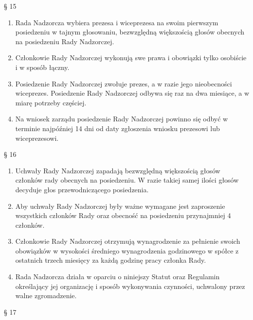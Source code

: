 \documentclass[a4paper, 11pt]{article}
\begin{document}
§ 15\\
\begin{enumerate}
\item	Rada Nadzorcza wybiera prezesa i wiceprezesa na swoim pierwszym posiedzeniu w tajnym głosowaniu, bezwzględną większością głosów obecnych na posiedzeniu Rady Nadzorczej.
\item	Członkowie Rady Nadzorczej wykonują swe prawa i obowiązki tylko osobiście i w sposób łączny.
\item	Posiedzenie Rady Nadzorczej zwołuje prezes, a w razie jego nieobecności wiceprezes. Posiedzenie Rady Nadzorczej odbywa się raz na dwa miesiące, a w miarę potrzeby częściej.
\item	Na wniosek zarządu posiedzenie Rady Nadzorczej powinno się odbyć w terminie najpóźniej 14 dni od daty zgłoszenia wniosku prezesowi lub wiceprezesowi.

\end{enumerate}

§ 16\\
\begin{enumerate}
\item	Uchwały Rady Nadzorczej zapadają bezwzględną większością głosów członków rady obecnych na posiedzeniu. W razie takiej samej ilości głosów decyduje głos przewodniczącego posiedzenia.
\item	Aby uchwały Rady Nadzorczej były ważne wymagane jest zaproszenie wszystkich członków Rady oraz obecność na posiedzeniu przynajmniej 4 członków.
\item	Członkowie Rady Nadzorczej otrzymują wynagrodzenie za pełnienie swoich obowiązków w wysokości średniego wynagrodzenia godzinowego w spółce z ostatnich trzech miesięcy za każdą godzinę pracy członka Rady.
\item	Rada Nadzorcza działa w oparciu o niniejszy Statut oraz Regulamin określający jej organizację i sposób wykonywania czynności, uchwalony przez walne zgromadzenie.
\end{enumerate}


§ 17\\
\end{document}
